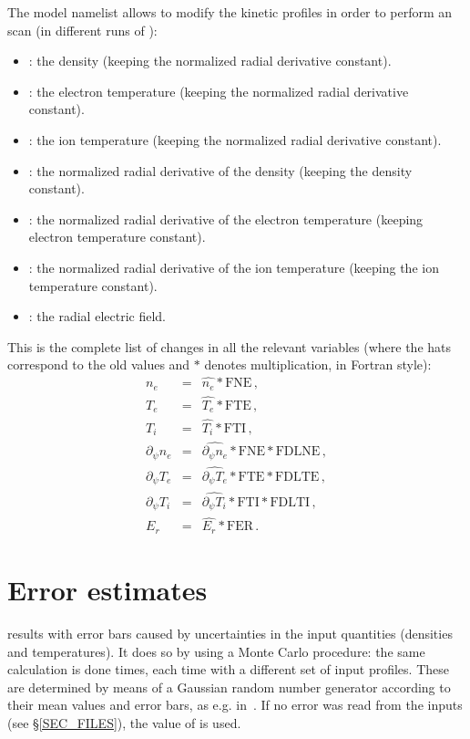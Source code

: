 The {\ttfamily model} namelist allows to modify the kinetic profiles in order to perform an scan (in different runs of \KNOSOS):
\begin{itemize}
\item {}: the density (keeping the normalized radial derivative constant).
\item {}: the electron temperature (keeping the normalized radial derivative constant).
\item {}: the ion temperature (keeping the normalized radial derivative constant).
\item {}: the normalized radial derivative of the density (keeping the density constant).
\item {}: the normalized radial derivative of the electron temperature (keeping electron temperature constant).
\item {}: the normalized radial derivative of the ion temperature (keeping the ion temperature constant).
\item {}: the radial electric field.
\end{itemize}

This is the complete list of changes in all the relevant variables (where the hats correspond to the old values and $*$ denotes multiplication, in Fortran style):
\begin{eqnarray}
  n_e&=& \hat{n_e} *\mathrm{FNE}\,,\nonumber\\
  T_e&=& \hat{T_e} *\mathrm{FTE}\,,\nonumber\\
  T_i&=& \hat{T_i} *\mathrm{FTI}\,,\nonumber\\
  \partial_\psi n_e&=& \hat{\partial_\psi n_e} *\mathrm{FNE} *\mathrm{FDLNE}\,,\nonumber\\
  \partial_\psi T_e&=& \hat{\partial_\psi T_e} *\mathrm{FTE} *\mathrm{FDLTE}\,,\nonumber\\
  \partial_\psi T_i&=& \hat{\partial_\psi T_i} *\mathrm{FTI} *\mathrm{FDLTI}\,,\nonumber\\
  E_r&=& \hat{E_r} *\mathrm{FER}\,.
\end{eqnarray}







\section{Error estimates}\label{SEC_ERROR}

 results with error bars caused by uncertainties in the input quantities (densities and temperatures). It does so by using a Monte Carlo procedure: the same calculation is done  times, each time with a different set of input profiles. These are determined by means of a Gaussian random number generator according to their mean values and error bars, as e.g. in~\cite{velasco2011bootstrap}. If no error was read from the inputs (see \S\ref{SEC_FILES}), the value of  is used.

